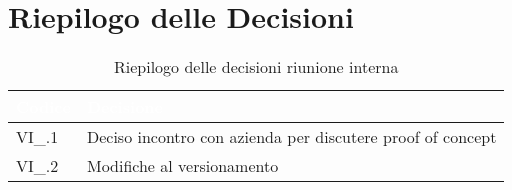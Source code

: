 \section{Riepilogo delle Decisioni}


\begin{table}[!htbp]
\renewcommand{\arraystretch}{1.5}
\begin{tabular}{m{}<{\centering}  m{}<{\centering}}
\rowcolor{darkblue} \textcolor{white}{\textbf{Codice}} & \textcolor{white}{\textbf{Decisione}} \\
\hline
VI\_\D{}.1 & Deciso incontro con azienda per discutere proof of concept \\
\rowcolor{gray!25} VI\_\D{}.2 & Modifiche al versionamento \\
\end{tabular}
\caption{Riepilogo delle decisioni riunione interna \D{}}
\end{table}